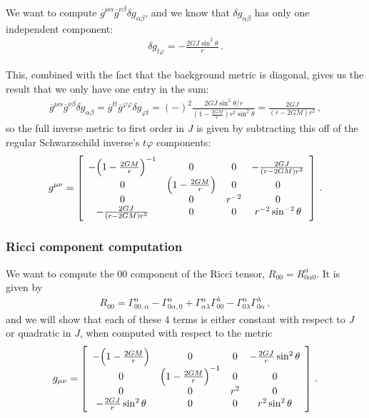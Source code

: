 \documentclass[main.tex]{subfiles}
\begin{document}
We want to compute \(\overline{g}^{\mu \alpha } \overline{g}^{\nu \beta } \delta g_{\alpha \beta }\), and we know that \(\delta g_{\alpha \beta } \) has only one independent component: 
%
\begin{align}
  \delta g_{t \varphi } = - \frac{2 GJ  \sin^2\theta }{r}
\,.
\end{align}

This, combined with the fact that the background metric is diagonal, gives us the result that we only have one entry in the sum: 
%
\begin{align}
  \overline{g}^{\mu \alpha } \overline{g}^{\nu \beta } \delta g_{\alpha \beta }
  = \overline{g}^{tt} \overline{g}^{\varphi \varphi }
  \delta g_{\varphi  t}
  =(-)^2 \frac{2GJ \sin^2 \theta /r }{(1 - \frac{2GM}{r}) r^2 \sin^2 \theta }
  = \frac{2GJ}{(r - 2GM) r^2}
  \,,
\end{align}
%
so the  full inverse metric to first order in \(J\) is given by subtracting this off of the regular Schwarzschild inverse's \(t \varphi \) components: 
%
\begin{align}
  g^{\mu \nu } = \left[\begin{array}{cccc}
    -\qty(1 -\frac{2GM}{r})^{-1}  & 0 & 0 & -\frac{2GJ}{(r - 2GM)r^2} \\ 
    0 & \qty(1- \frac{2GM}{r}) & 0 & 0 \\ 
    0 & 0 & r^{-2} & 0 \\ 
    -\frac{2GJ}{(r - 2GM)r^2} & 0 & 0 & r^{-2} \sin^{-2} \theta 
    \end{array}\right]  
\,.
\end{align}

\subsubsection{Ricci component computation}

We want to compute the 00 component of the Ricci tensor, \(R_{00} = R^{\alpha }_{0 \alpha 0}\). It is given by 
%
\begin{align}
  R_{00} = \Gamma^{\alpha }_{00, \alpha }
  - \Gamma^{\alpha }_{0 \alpha, 0}
  + \Gamma^{\alpha }_{\alpha \lambda }
  \Gamma^{\lambda }_{00}
  - \Gamma^{\alpha }_{0\lambda } 
  \Gamma^{\lambda }_{0 \alpha }
\,,
\end{align}
%
and we will show that each of these 4 terms is either constant with respect to \(J\) or quadratic in \(J\), when computed with respect to the metric 
%
\begin{align}
  g_{\mu \nu } = 
  \left[\begin{array}{cccc}
  -\qty(1- \frac{2GM}{r}) & 0 & 0 & - \frac{2GJ}{r} \sin^2\theta  \\ 
  0 & \qty(1 - \frac{2GM}{r})^{-1} & 0 & 0 \\ 
  0 & 0 & r^2 & 0 \\ 
  - \frac{2GJ}{r} \sin^2\theta  & 0 & 0 & r^2 \sin^2 \theta 
  \end{array}\right]
\,.
\end{align}
\end{document}
